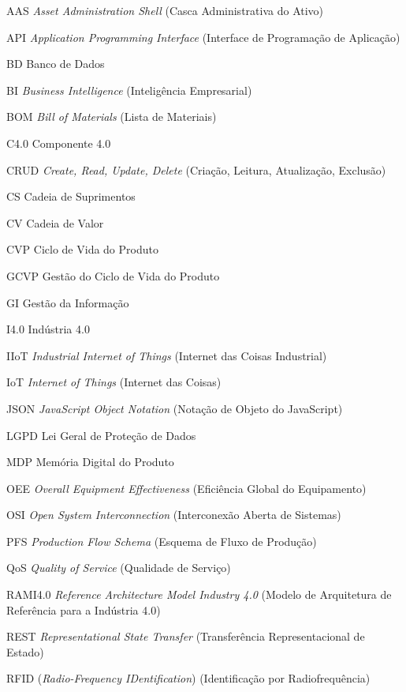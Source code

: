 \begin{siglas}
	\item[AAS] \textit{Asset Administration Shell} (Casca Administrativa do Ativo)
	\item[API] \textit{Application Programming Interface} (Interface de Programação de Aplicação)
	\item[BD] Banco de Dados
	\item[BI] \textit{Business Intelligence} (Inteligência Empresarial)
	\item[BOM] \textit{Bill of Materials} (Lista de Materiais)
	\item[C4.0] Componente 4.0
	\item[CRUD] \textit{Create, Read, Update, Delete} (Criação, Leitura, Atualização, Exclusão)
	\item[CS] Cadeia de Suprimentos
	\item[CV] Cadeia de Valor
	\item[CVP] Ciclo de Vida do Produto
	\item[GCVP] Gestão do Ciclo de Vida do Produto
	\item[GI] Gestão da Informação
	\item[I4.0] Indústria 4.0
	\item[IIoT] \textit{Industrial Internet of Things} (Internet das Coisas Industrial)
	\item[IoT] \textit{Internet of Things} (Internet das Coisas)
	\item[JSON] \textit{JavaScript Object Notation} (Notação de Objeto do JavaScript)
	\item[LGPD] Lei Geral de Proteção de Dados
	\item[MDP] Memória Digital do Produto
	\item[OEE] \textit{Overall Equipment Effectiveness} (Eficiência Global do Equipamento)
	\item[OSI] \textit{Open System Interconnection} (Interconexão Aberta de Sistemas)
	\item[PFS] \textit{Production Flow Schema} (Esquema de Fluxo de Produção)
	\item[QoS] \textit{Quality of Service} (Qualidade de Serviço)
	\item[RAMI4.0] \textit{Reference Architecture Model Industry 4.0} (Modelo de Arquitetura de Referência para a Indústria 4.0)
	\item[REST] \textit{Representational State Transfer} (Transferência Representacional de Estado)
	\item[RFID] (\textit{Radio-Frequency IDentification}) (Identificação por Radiofrequência)

\end{siglas}
